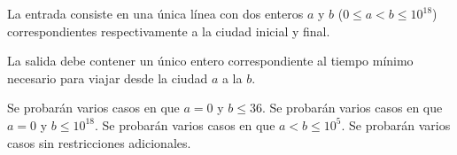 \documentclass{oci}
\begin{document}
\begin{inputDescription}
  La entrada consiste en una única línea con dos enteros $a$ y $b$ ($0\leq a < b \leq 10^{18}$)
  correspondientes respectivamente a la ciudad inicial y final.
\end{inputDescription}

\begin{outputDescription}
  La salida debe contener un único entero correspondiente al tiempo mínimo necesario
  para viajar desde la ciudad $a$ a la $b$.
\end{outputDescription}

\begin{scoreDescription}
  Se probarán varios casos en que $a = 0$ y $b \leq 36$.
  Se probarán varios casos en que $a = 0$ y $b \leq 10^{18}$.
  Se probarán varios casos en que $a < b \leq 10^5$.
  Se probarán varios casos sin restricciones adicionales.
\end{scoreDescription}

\begin{sampleDescription}
\end{sampleDescription}
\end{document}

